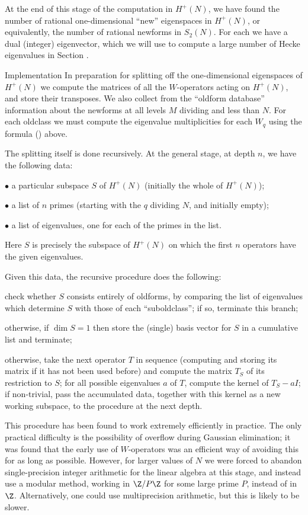 At the end of this stage of the computation in $H^+(N)$, we have found the
number of rational one-dimensional ``new'' eigen\-spaces in $H^+(N)$, or
equivalently, the number of rational newforms in $S_2(N)$.   For each we
have a dual (integer) eigenvector, which we will use to compute a large
number of Hecke eigen\-values in Section \Ap.

\subhead Implementation \endsubhead
In preparation for splitting off the one-dimensional eigen\-spaces of 
$H^{+}(N)$ we compute the matrices of all the $W$-operators acting on 
$H^{+}(N)$, and store their transposes.   We also collect from the 
``oldform database'' information about the newforms at all levels $M$ 
dividing and less than $N$.   For each oldclass we must compute the 
eigenvalue multiplicities for each $W_q$ using the formula (\olddims) 
above.

The splitting itself is done recursively.   At the general stage, at depth
$n$, we have the following data:

$\bullet$ a particular subspace $S$ of $H^{+}(N)$ (initially the whole of
$H^{+}(N)$);

$\bullet$ a list of $n$ primes (starting with the $q$ dividing $N$, and
initially empty);

$\bullet$ a list of eigen\-values, one for each of the primes in the list.

\noindent Here $S$ is precisely the subspace of $H^{+}(N)$ on which the
first $n$ operators have the given eigen\-values.


Given this data, the recursive procedure does the following:
\roster
\item check whether $S$ consists entirely of oldforms, by comparing the
      list of eigen\-values which determine $S$ with those of each
      ``suboldclass''; if so, terminate this branch;
\item otherwise, if $\dim S=1$ then store the (single) basis vector for $S$
      in a cumulative list and terminate;
\item otherwise, take the next operator $T$ in sequence (computing and
      storing its matrix if it has not been used before) and compute the
      matrix $T_S$ of its restriction to $S$; for all
      possible eigen\-values $a$ of $T$, compute the kernel of $T_S-aI$; if
      non-trivial, pass the accumulated data, together with this kernel as
      a new working subspace, to the procedure at the next depth.
\endroster

This procedure has been found to work extremely efficiently in
practice.  The only practical difficulty is the possibility of
overflow during Gaussian elimination; it was found that the early use
of $W$-operators was an efficient way of avoiding this for as long as
possible.  However, for larger values of $N$ we were forced to abandon
single-precision integer arithmetic for the linear algebra at this
stage, and instead use a modular method, working in $\Z/P\Z$ for some
large prime $P$, instead of in $\Z$.  Alternatively, one could use
multiprecision arithmetic, but this is likely to be slower.

